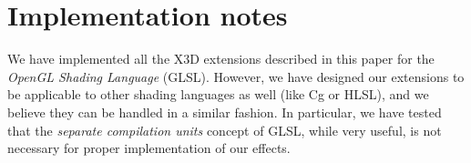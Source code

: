 \documentclass{egpubl}
\begin{document}

\section{Implementation notes}

We have implemented all the X3D extensions described in this paper
for the \emph{OpenGL Shading Language} (GLSL).
However, we have designed our extensions
to be applicable to other shading languages as well (like Cg or HLSL),
and we believe they can be handled in a similar fashion.
In particular, we have tested that the \emph{separate compilation units}
concept of GLSL, while very useful, is not necessary for proper implementation
of our effects.







\end{document}
